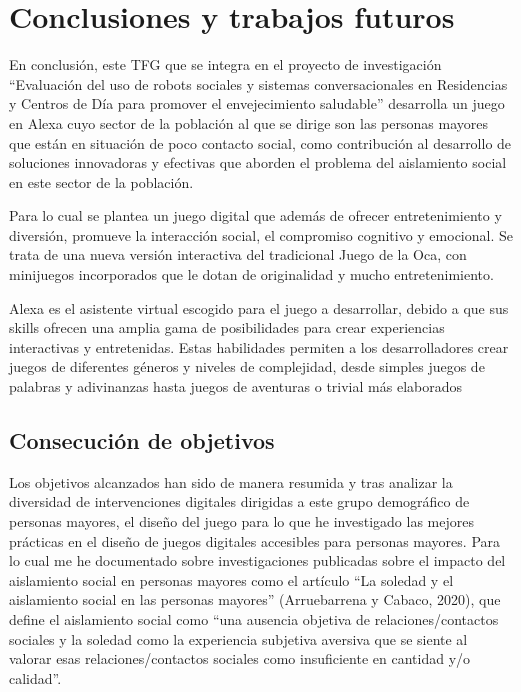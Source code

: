 \section{Conclusiones y trabajos futuros}
En conclusión, este TFG que se integra en el proyecto de investigación “Evaluación del uso de robots sociales y sistemas conversacionales en Residencias y Centros de Día para promover el envejecimiento saludable” desarrolla un juego en Alexa cuyo sector de la población al que se dirige son las personas mayores que están en situación de poco contacto social, como contribución al desarrollo de soluciones innovadoras y efectivas que aborden el problema del aislamiento social en este sector de la población.

Para lo cual se plantea un juego digital que además de ofrecer entretenimiento y diversión, promueve la interacción social, el compromiso cognitivo y emocional. Se trata de una nueva versión interactiva del tradicional Juego de la Oca, con minijuegos incorporados que le dotan de originalidad y mucho entretenimiento.

Alexa es el asistente virtual escogido para el juego a desarrollar, debido a que sus skills ofrecen una amplia gama de posibilidades para crear experiencias interactivas y entretenidas. Estas habilidades permiten a los desarrolladores crear juegos de diferentes géneros y niveles de complejidad, desde simples juegos de palabras y adivinanzas hasta juegos de aventuras o trivial más elaborados

\subsection{Consecución de objetivos}

Los objetivos alcanzados han sido de manera resumida y tras analizar la diversidad de intervenciones digitales dirigidas a este grupo demográfico de personas mayores, el diseño del juego para lo que he investigado las mejores prácticas en el diseño de juegos digitales accesibles para personas mayores. Para lo cual me he documentado sobre investigaciones publicadas sobre el impacto del aislamiento social en personas mayores como el artículo “La soledad y el aislamiento social en las personas mayores” (Arruebarrena y Cabaco, 2020), que define el aislamiento social como “una ausencia objetiva de relaciones/contactos sociales y la soledad como la experiencia subjetiva aversiva que se siente al valorar esas relaciones/contactos sociales como insuficiente en cantidad y/o calidad”.


